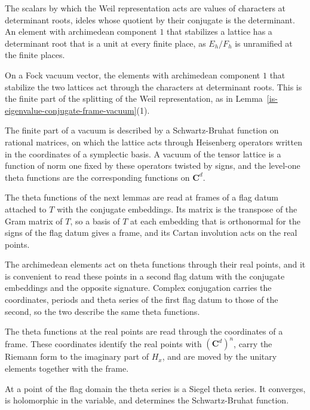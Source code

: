 The scalars by which the Weil representation acts are values of characters at determinant roots,
ideles whose quotient by their conjugate is the determinant. An element with archimedean component $1$
that stabilizes a lattice has a determinant root that is a unit at every finite place, as $E_h/F_h$ is
unramified at the finite places.

On a Fock vacuum vector, the elements with archimedean component $1$ that stabilize the two lattices act
through the characters at determinant roots. This is the finite part of the splitting of the Weil
representation, as in Lemma~\ref{is-eigenvalue-conjugate-frame-vacuum}(1).

The finite part of a vacuum is described by a Schwartz-Bruhat function on rational matrices, on which the
lattice acts through Heisenberg operators written in the coordinates of a symplectic basis. A vacuum of the
tensor lattice is a function of norm one fixed by these operators twisted by signs, and the level-one theta
functions are the corresponding functions on $\mathbf C^d$.

The theta functions of the next lemmas are read at frames of a flag datum attached to $T$ with the conjugate
embeddings. Its matrix is the transpose of the Gram matrix of $T$, so a basis of $T$ at each embedding that
is orthonormal for the signs of the flag datum gives a frame, and its Cartan involution acts on the real
points.

The archimedean elements act on theta functions through their real points, and it is convenient to read
these points in a second flag datum with the conjugate embeddings and the opposite signature. Complex
conjugation carries the coordinates, periods and theta series of the first flag datum to those of the
second, so the two describe the same theta functions.

The theta functions at the real points are read through the coordinates of a frame. These coordinates identify the
real points with $(\mathbf C^d)^n$, carry the Riemann form to the imaginary part of $H_x$, and are moved by the unitary
elements together with the frame.

At a point of the flag domain the theta series is a Siegel theta series. It converges, is holomorphic in the variable,
and determines the Schwartz-Bruhat function.

